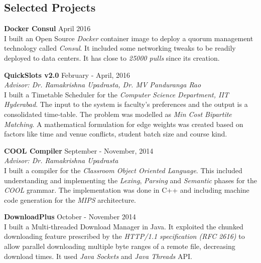 \documentclass[margin,line]{res}
\begin{document}
\begin{resume}
\section{\sc Selected Projects}

  {\bf Docker Consul} \hfill April 2016 \\
	I built an Open Source {\it Docker} container image to deploy a quorum management technology called {\it Consul}. It included some networking tweaks to be readily deployed to data centers. It has close to {\em 25000 pulls} since its creation.

  \vspace*{-2.5mm}

  {\bf QuickSlots v2.0} \hfill February - April, 2016 \\
  	{\it Advisor: Dr. Ramakrishna Upadrasta, Dr. MV Panduranga Rao} \\
    I built a Timetable Scheduler for the {\it Computer Science Department, IIT Hyderabad}. The input to the system is faculty's preferences and the output is a consolidated time-table. The problem was modelled as {\em Min Cost Bipartite Matching}. A mathematical formulation for edge weights was created based on factors like time and venue conflicts, student batch size and course kind.

  \vspace*{-2.5mm}

  {\bf COOL Compiler} \hfill September - November, 2014 \\
  	{\it Advisor: Dr. Ramakrishna Upadrasta} \\
  	I built a compiler for the {\it Classroom Object Oriented Language}. This included understanding and implementing the {\em Lexing}, {\em Parsing} and {\em Semantic} phases for the {\it COOL} grammar. The implementation was done in C++ and including machine code generation for the {\it MIPS} architecture.

  \vspace*{-2.5mm}

  {\bf DownloadPlus} \hfill October - November 2014 \\
  	I built a Multi-threaded Download Manager in Java. It exploited the chunked downloading feature prescribed by the {\it HTTP/1.1 specification (RFC 2616)} to allow parallel downloading multiple byte ranges of a remote file, decreasing download times. It used {\it Java Sockets} and {\it Java Threads} API.

  \vspace*{-2.5mm}


\end{resume}
\end{document}
